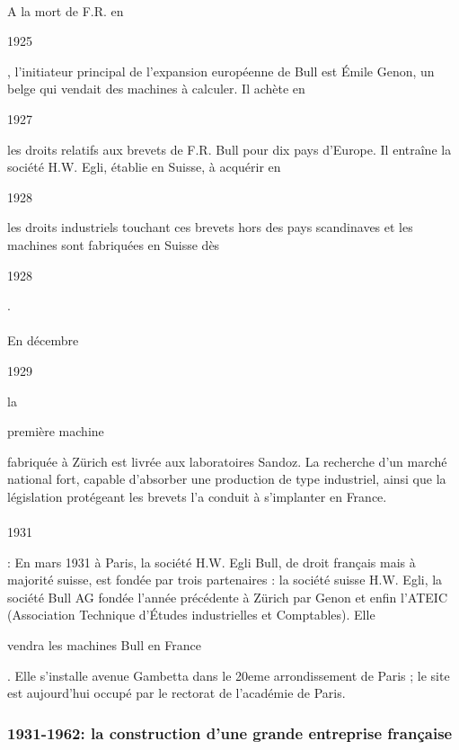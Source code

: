 \documentclass{article}
\begin{document}
		\paragraph{}
		A la mort de F.R. en \begin{bf}1925\end{bf}, l'initiateur principal de l'expansion européenne de Bull est Émile 
		Genon, un belge qui vendait des machines à calculer. Il achète en \begin{bf}1927\end{bf} les droits relatifs aux 
		brevets de F.R. Bull pour dix pays d'Europe. Il entraîne la société H.W. Egli, établie en Suisse, à acquérir en \begin{bf}1928\end{bf}
		 les droits industriels touchant ces brevets hors des pays scandinaves et les machines sont fabriquées en Suisse dès \begin{bf}1928\end{bf}.
		\paragraph{}
		En décembre \begin{bf}1929\end{bf} la \begin{bf}première machine\end{bf} fabriquée à Zürich est livrée aux laboratoires Sandoz. 
		La recherche d’un marché national fort, capable d’absorber une production de type industriel, ainsi que la législation 
		protégeant les brevets l’a conduit à s’implanter en France.
		\paragraph{}
		\begin{bf}1931\end{bf}: En mars 1931 à Paris, la société H.W. Egli Bull, de droit français mais à majorité suisse, 
		est fondée par trois partenaires : la société suisse H.W. Egli, la société Bull AG fondée l'année précédente à Zürich 
		par Genon et enfin l'ATEIC (Association Technique d'Études industrielles et Comptables). Elle \begin{bf}vendra les 
		machines Bull en France\end{bf}. Elle s’installe avenue Gambetta dans le 20eme arrondissement de Paris ; le site est 
		aujourd’hui occupé par le rectorat de l’académie de Paris.
		\subsubsection{1931-1962: la construction d'une grande entreprise française}
\end{document}
